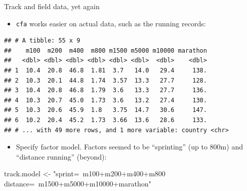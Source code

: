 \documentclass[
  ignorenonframetext,
]{beamer}
\newenvironment{Shaded}{\begin{snugshade}}{\end{snugshade}}
\newcommand{\DataTypeTok}[1]{\textcolor[rgb]{0.13,0.29,0.53}{#1}}
\newcommand{\DecValTok}[1]{\textcolor[rgb]{0.00,0.00,0.81}{#1}}
\newcommand{\KeywordTok}[1]{\textcolor[rgb]{0.13,0.29,0.53}{\textbf{#1}}}
\newcommand{\NormalTok}[1]{#1}
\newcommand{\OperatorTok}[1]{\textcolor[rgb]{0.81,0.36,0.00}{\textbf{#1}}}
\newcommand{\StringTok}[1]{\textcolor[rgb]{0.31,0.60,0.02}{#1}}
\providecommand{\tightlist}{%
  \setlength{\itemsep}{0pt}\setlength{\parskip}{0pt}}
\begin{document}
\begin{frame}[fragile]{Track and field data, yet again}
\protect\hypertarget{track-and-field-data-yet-again}{}

\begin{itemize}
\tightlist
\item
  \texttt{cfa} works easier on actual data, such as the running records:
\end{itemize}

\footnotesize

\begin{Shaded}
\end{Shaded}

\begin{verbatim}
## # A tibble: 55 x 9
##    m100  m200  m400  m800 m1500 m5000 m10000 marathon
##   <dbl> <dbl> <dbl> <dbl> <dbl> <dbl>  <dbl>    <dbl>
## 1  10.4  20.8  46.8  1.81  3.7   14.0   29.4     138.
## 2  10.3  20.1  44.8  1.74  3.57  13.3   27.7     128.
## 3  10.4  20.8  46.8  1.79  3.6   13.3   27.7     136.
## 4  10.3  20.7  45.0  1.73  3.6   13.2   27.4     130.
## 5  10.3  20.6  45.9  1.8   3.75  14.7   30.6     147.
## 6  10.2  20.4  45.2  1.73  3.66  13.6   28.6     133.
## # ... with 49 more rows, and 1 more variable: country <chr>
\end{verbatim}

\normalsize

\begin{itemize}
\tightlist
\item
  Specify factor model. Factors seemed to be ``sprinting'' (up to 800m)
  and ``distance running'' (beyond):
\end{itemize}

\footnotesize

\begin{Shaded}
\begin{Highlighting}[]
\NormalTok{track.model <-}\StringTok{ "sprint=~m100+m200+m400+m800}
\StringTok{                distance=~m1500+m5000+m10000+marathon"}
\end{Highlighting}
\end{Shaded}

\normalsize

\end{frame}
\end{document}
